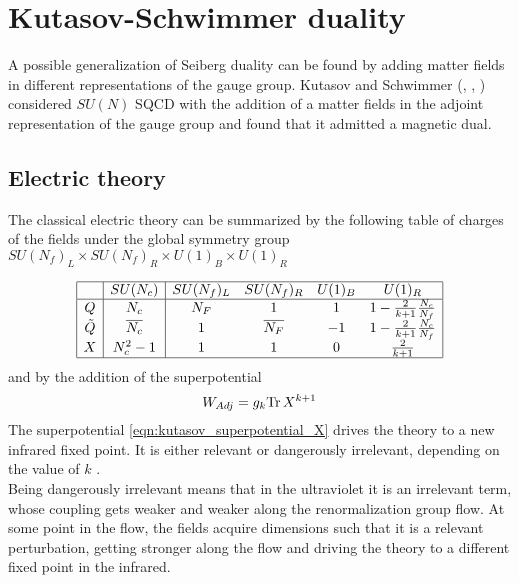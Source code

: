 


\section{Kutasov-Schwimmer duality}
\label{sec:kutasov_duality4d}
A possible generalization of Seiberg duality can be found by adding matter fields in different representations of the gauge group.
Kutasov and Schwimmer (\cite{Kutasov:1995ve}, \cite{Kutasov:1995np}, \cite{Kutasov:1995ss}) considered $SU(N)$ SQCD with the addition of a matter fields in the adjoint representation of the gauge group and found that it admitted a magnetic dual.

\subsection{Electric theory }
The classical electric theory can be summarized by the following table of charges of the fields under the global symmetry group $SU(N_f)_L \times SU(N_f)_R \times U(1)_B \times U(1)_R
$

\begin{equation}
\begin{array}{| c | c | c c c c | }
\hline
 & SU(N_c) &SU(N_f)_L  &SU(N_f)_R   & U(1)_B &  U(1)_R \\
\hline
Q & N_c&N_F & 1   &  1  &  1 - \frac{2}{k+1} \frac{N_c}{N_f}  \\
\tilde{Q} & \overline{N_c} &  1 & \overline{ N_F}   & -1   &   1 - \frac{2}{k+1} \frac{N_c}{N_f}    \\
X & N_c^2-1 & 1   & 1    & 0   &  \frac{2}{k+1} \\
\hline
\end{array}
\centering
\label{table:charge_table_el_ks_4d}
\end{equation}
and by the addition of the superpotential
\begin{equation}
	W_{Adj} = g_k \mathrm{Tr } \,{X^{k+1}}
	\label{eqn:kutasov_superpotential_X}
\end{equation}
The superpotential \eqref{eqn:kutasov_superpotential_X} drives the theory to a new infrared fixed point. It is either relevant or dangerously irrelevant, depending on the value of $k$ \cite{Kutasov:1995np}. \\
Being dangerously irrelevant means that in the ultraviolet it is an irrelevant term, whose coupling gets weaker and weaker along the renormalization group flow.
At some point in the flow, the fields acquire dimensions such that it is a relevant perturbation, getting stronger along the flow and driving the theory to a different fixed point in the infrared.

